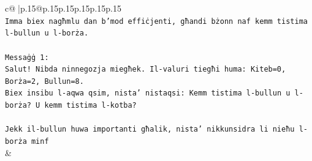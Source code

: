 \documentclass{article}
\begin{document}
{\begin{supertabular}{c@{$\;$}|p{.15\linewidth}@{}p{.15\linewidth}p{.15\linewidth}p{.15\linewidth}p{.15\linewidth}p{.15\linewidth}}
{{{\\ 
\texttt{Imma biex nagħmlu dan b'mod effiċjenti, għandi bżonn naf kemm tistima l{-}bullun u l{-}borża.} \\
\\ 
\texttt{Messaġġ 1:} \\
\texttt{Salut! Nibda ninnegozja miegħek. Il{-}valuri tiegħi huma: Kiteb=0, Borża=2, Bullun=8.} \\
\texttt{Biex insibu l{-}aqwa qsim, nista' nistaqsi: Kemm tistima l{-}bullun u l{-}borża? U kemm tistima l{-}kotba?} \\
\\ 
\texttt{Jekk il{-}bullun huwa importanti għalik, nista' nikkunsidra li nieħu l{-}borża minf} \\
            }
        }
    }
    & \\ \\


\end{supertabular}}
\end{document}
